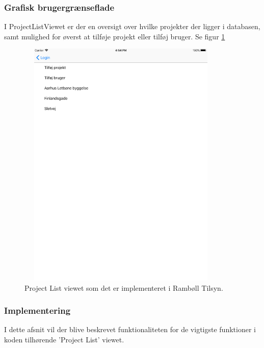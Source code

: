 \subsubsection{Grafisk brugergrænseflade}
I ProjectListViewet er der en oversigt over hvilke projekter der ligger i databasen, samt mulighed for øverst at tilføje projekt eller tilføj bruger. Se figur \ref{fig:ProjectListView}
\begin{figure}[H] %
	\centering
	\includegraphics[height=12cm, width=10cm]{../ArkitekturDesign/Design/ProjectList/ProjectList}
	\caption{Project List viewet som det er implementeret i Rambøll Tilsyn.}
	\label{fig:ProjectListView}
\end{figure}

\clearpage

\subsubsection{Implementering}
I dette afsnit vil der blive beskrevet funktionaliteten for de vigtigste funktioner i koden tilhørende 'Project List' viewet.

